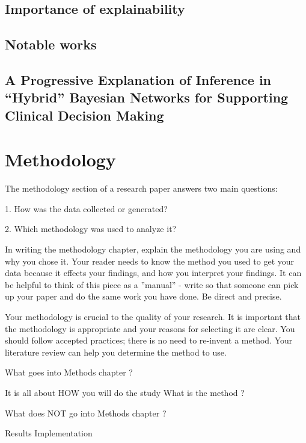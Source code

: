 \documentclass[mscthesis]{usiinfthesis}
\begin{document}
\section{Importance of explainability}

\section{Notable works}



\section{A Progressive Explanation of Inference in \enquote{Hybrid} Bayesian Networks for Supporting Clinical Decision Making}


\chapter{Methodology}\label{chap:methodology}
The methodology section of a research paper answers two main questions:

1. How was the data collected or generated?

2. Which methodology was used to analyze it?

In writing the methodology chapter, explain the methodology you are using and why you chose it. Your reader needs to know the method you used to get your data because it effects your findings, and how you interpret your findings. It can be helpful to think of this piece as a ''manual'' - write so that someone can pick up your paper and do the same work you have done. Be direct and precise.

Your methodology is crucial to the quality of your research. It is important that the methodology is appropriate and your reasons for selecting it are clear. You should follow accepted practices; there is no need to re-invent a method. Your literature review can help you determine the method to use.

What  goes  into  Methods  chapter  ?  

It  is  all  about  HOW  you  will  do  the  study   What  is  the  method  ?  

What  does NOT go  into  Methods  chapter  ?  

Results  Implementation
\end{document}
